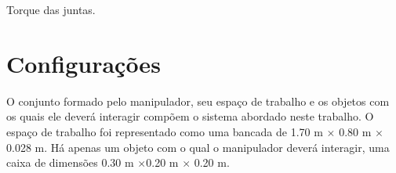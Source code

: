 \begin{table}[H]
    \centering
    \caption{Torque das juntas.}
    \label{tab:joints_torque}
    \caption*{Fonte: Autoria própria.}
\end{table}
\section{Configurações}
\label{sec:configuracoes}

O conjunto formado pelo manipulador, seu espaço de trabalho e os objetos com os quais ele deverá interagir compõem o sistema abordado neste trabalho. O espaço de trabalho foi representado como uma bancada de 1.70 m $\times$ 0.80 m $\times$ 0.028 m. Há apenas um objeto com o qual o manipulador deverá interagir, uma caixa de dimensões 0.30 m $\times $0.20 m $\times$ 0.20 m.

